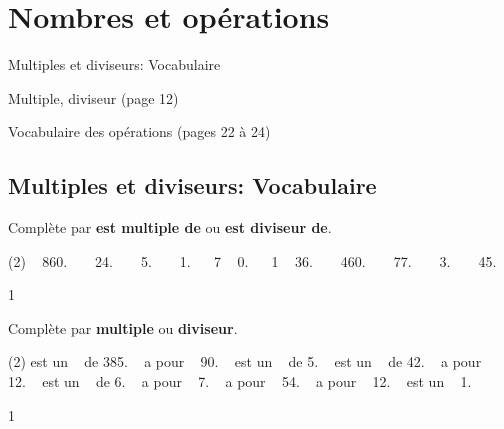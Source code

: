 \documentclass[a4paper,11pt]{report}
\begin{document}
\newcommand{\chapterName}{Nombres et opérations}
\newcommand{\serieName}{Multiples et diviseurs: Vocabulaire}


\chapter*{\chapterName}
\thispagestyle{empty}

\begin{amL}{\serieName}{
\item Multiple, diviseur (page 12)
\item Vocabulaire des opérations (pages 22 à 24)
}\end{amL}

\section*{\serieName}
\setcounter{page}{1}
\thispagestyle{firstPage}




\begin{exop}{
Complète par {\color{blue} \textbf{est multiple de}} ou  {\color{blue} \textbf{est diviseur de}}.

\begin{tasks}(2)
     \hrulefill~ 860. \quad~
     \hrulefill~ 24. \quad~
     \hrulefill~ 5. \quad~
     \hrulefill~ 1. \quad~
    \task ~7 \hrulefill~ 0. \quad~
    \task ~1 \hrulefill~ 36. \quad~
     \hrulefill~ 460. \quad~
     \hrulefill~ 77. \quad~
     \hrulefill~ 3. \quad~
     \hrulefill~ 45. \quad~
\end{tasks}
\smallskip
}{1}\end{exop}





\begin{exop}{
Complète par {\color{blue} \textbf{multiple}} ou  {\color{blue} \textbf{diviseur}}.
\begin{tasks}(2)
     est un \hrulefill~ de 385. \quad~
     a pour \hrulefill~ 90. \quad~
     est un \hrulefill~ de 5. \quad~
     est un \hrulefill~ de 42. \quad~
     a pour \hrulefill~ 12. \quad~
     est un \hrulefill~ de 6. \quad~
     a pour \hrulefill~ 7. \quad~
     a pour \hrulefill~ 54. \quad~
     a pour \hrulefill~ 12. \quad~
     est un \hrulefill~ 1. \quad~
\end{tasks}
\smallskip
}{1}\end{exop}
\end{document}
